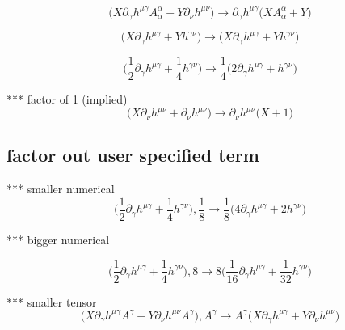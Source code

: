 \documentclass{article}
\def\){\Big)}
\def\({\Big(}
\begin{document}
\begin{equation}
\(X \partial_{\gamma}h^{\mu \gamma} A^{\alpha}_{\alpha} + Y \partial_{\nu} h^{\mu \nu}\) \rightarrow
 \partial_{\gamma}h^{\mu \gamma} \(X A_{\alpha}^{\alpha} +Y \)
\end{equation}

\begin{equation}
\(X \partial_{\gamma}h^{\mu \gamma} + Y h^{\gamma \nu}\) \rightarrow
\(X \partial_{\gamma}h^{\mu \gamma} +Y h^{\gamma \nu} \)
\end{equation}

\begin{equation}
\(\frac{1}{2} \partial_{\gamma}h^{\mu \gamma} + \frac{1}{4}  h^{\gamma \nu}\) \rightarrow
\frac{1}{4} \(2 \partial_{\gamma}h^{\mu \gamma} + h^{\gamma \nu} \)
\end{equation}

*** factor of 1 (implied)
\begin{equation}
\(X \partial_{\nu}h^{\mu \nu} + \partial_{\nu} h^{\mu \nu}\) \rightarrow
\partial_{\nu}h^{\mu \nu} \(X +1 \)
\end{equation}

\subsection{factor out user specified term}

*** smaller numerical
\begin{equation}
\(\frac{1}{2} \partial_{\gamma}h^{\mu \gamma} + \frac{1}{4}  h^{\gamma \nu}\) , \frac{1}{8} \rightarrow
\frac{1}{8} \(4 \partial_{\gamma}h^{\mu \gamma} +2 h^{\gamma \nu} \)
\end{equation}

*** bigger numerical

\begin{equation}
\(\frac{1}{2} \partial_{\gamma}h^{\mu \gamma} + \frac{1}{4}  h^{\gamma \nu}\) , 8 \rightarrow
8 \(\frac{1}{16} \partial_{\gamma}h^{\mu \gamma} +\frac{1}{32} h^{\gamma \nu} \)
\end{equation}


*** smaller tensor\\

\begin{equation}
\(X \partial_{\gamma}h^{\mu \gamma} A^{\gamma} + Y \partial_{\nu} h^{\mu \nu}A^{\gamma}\) , A^{\gamma} \rightarrow
A^{\gamma} \(X \partial_{\gamma}h^{\mu \gamma} +Y \partial_{\nu}h^{\mu \nu} \)
\end{equation}
\end{document}
